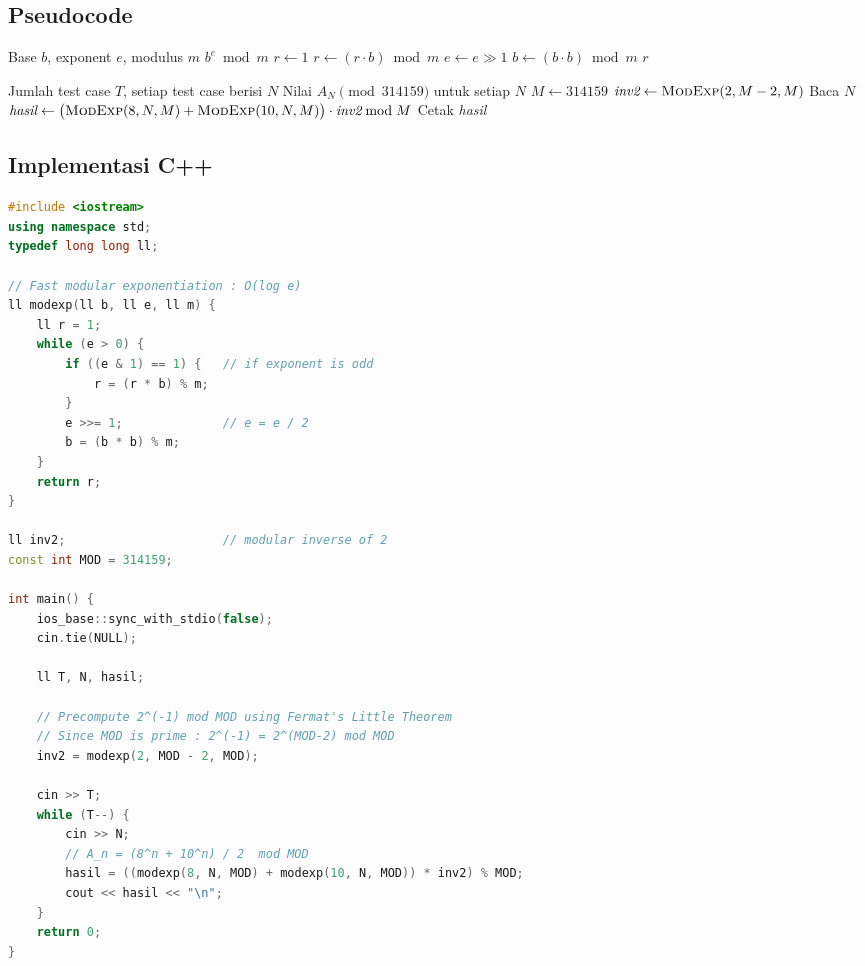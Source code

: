 \documentclass[12pt,a4paper]{article}
\theoremstyle{definition}
\begin{document}
\subsection{Pseudocode}

\begin{algorithm}[H]
\caption{Modular Exponentiation}
\begin{algorithmic}[1]
\Require Base $b$, exponent $e$, modulus $m$
\Ensure $b^e \bmod m$
  \State $r \gets 1$
      \State $r \gets (r \cdot b) \bmod m$
    \EndIf
    \State $e \gets e \gg 1$ 
    \State $b \gets (b \cdot b) \bmod m$
  \EndWhile
  \State \Return $r$
\EndFunction
\end{algorithmic}
\end{algorithm}

\begin{algorithm}[H]
\caption{OAE -- Hitung $A_n \pmod{314159}$}
\begin{algorithmic}[1]
\Require Jumlah test case $T$, setiap test case berisi $N$
\Ensure Nilai $A_N \pmod{314159}$ untuk setiap $N$
\State $M \gets 314159$
\State $\textit{inv2} \gets \Call{ModExp}{2, M-2, M}$ 
  \State Baca $N$
  \State $\textit{hasil} \gets \bigl(\Call{ModExp}{8,N,M} + \Call{ModExp}{10,N,M}\bigr) \cdot \textit{inv2} \bmod M$
  \State Cetak \textit{hasil}
\EndFor
\end{algorithmic}
\end{algorithm}

\subsection{Implementasi C++}

\begin{lstlisting}[language=C++, caption={SPOJ OAE -- Solusi dengan Closed-Form dan Modular Exponentiation}]
#include <iostream>
using namespace std;
typedef long long ll;

// Fast modular exponentiation : O(log e)
ll modexp(ll b, ll e, ll m) {
    ll r = 1;
    while (e > 0) {
        if ((e & 1) == 1) {   // if exponent is odd
            r = (r * b) % m;
        }
        e >>= 1;              // e = e / 2
        b = (b * b) % m;
    }
    return r;
}

ll inv2;                      // modular inverse of 2
const int MOD = 314159;

int main() {
    ios_base::sync_with_stdio(false);
    cin.tie(NULL);

    ll T, N, hasil;

    // Precompute 2^(-1) mod MOD using Fermat's Little Theorem
    // Since MOD is prime : 2^(-1) = 2^(MOD-2) mod MOD
    inv2 = modexp(2, MOD - 2, MOD);

    cin >> T;
    while (T--) {
        cin >> N;
        // A_n = (8^n + 10^n) / 2  mod MOD
        hasil = ((modexp(8, N, MOD) + modexp(10, N, MOD)) * inv2) % MOD;
        cout << hasil << "\n";
    }
    return 0;
}
\end{lstlisting}
\end{document}
